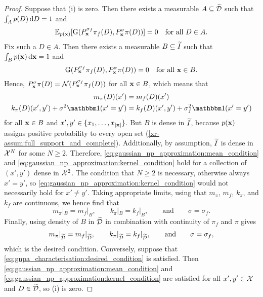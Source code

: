 \documentclass[12pt, twoside]{report}
\newcommand{\xrprefix}[1]{xr-#1}
\begin{document}
\begin{proof}
    Suppose that (i) is zero.
    Then there exists a measurable $A \sub \tD$ such that $\int_A p(D) \isd D = 1$ and
    \begin{equation}
        \E_{p(\vx)}[\text{G}(P^{\sigma_f}_\vx \pi_f(D), P^{\sigma}_\vx \pi(D))] = 0
        \quad \text{for all $D \in A$}.
    \end{equation}
    Fix such a $D \in A$.
    Then there exists a measurable $B \sub \tI$ such that $\int_{B} p(\vx) \isd \vx = 1$ and%
    \begin{equation}
        \text{G}(P^{\sigma_f}_\vx \pi_f(D), P^{\sigma}_\vx \pi(D)) = 0
        \quad \text{for all $\vx \in B$}.
    \end{equation}
    Hence,
    $
        P^{\sigma}_\vx \pi(D)
        = \Normal(P^{\sigma_f}_\vx \pi_f(D))
    $ for all $\vx \in B$, which means that
    \begin{align}
        \label{eq:gaussian_np_approximation:mean_condition}
        m_\pi(D)(x') &= m_f(D)(x') \\
        \label{eq:gaussian_np_approximation:kernel_condition}
        k_\pi(D)(x', y') + \sigma^2 \ind(x' = y') &= k_f(D)(x', y') + \sigma^2_f \ind(x' = y')
    \end{align}
    for all $\vx \in B$ and $x', y' \in \set{x_1, \ldots, x_{\abs{\vx}}}$.
    But $B$ is dense in $\tI$, because $p(\vx)$ assigns positive probability to every open set (\cref{\xrprefix{assum:full_support_and_complete}}). 
    Additionally, by assumption, $\tI$ is dense in $\X^N$ for some $N \ge 2$.
    Therefore, \eqref{eq:gaussian_np_approximation:mean_condition} and \eqref{eq:gaussian_np_approximation:kernel_condition} hold for a collection of $(x',y')$ dense in $\X^2$.
    The condition that $N \ge 2$ is necessary, otherwise always $x' = y'$, so \eqref{eq:gaussian_np_approximation:kernel_condition} would not necessarily hold for $x' \neq y'$.
    Taking appropriate limits, using that $m_\pi$, $m_f$, $k_\pi$, and $k_f$ are continuous, we hence find that
    \begin{equation}
        m_\pi|_{B} = m_f|_{B},
        \qquad
        k_\pi|_{B} = k_f|_{B},
        \qquad
        \text{and}
        \qquad
        \sigma = \sigma_f.
    \end{equation}
    Finally, using density of $B$ in $\tD$ in combination with continuity of $\pi_f$ and $\pi$ gives
    \begin{equation} \label{eq:gnpa_characterisation:desired_condition}
        m_\pi|_{\tD} = m_f|_{\tD},
        \qquad
        k_\pi|_{\tD} = k_f|_{\tD},
        \qquad
        \text{and}
        \qquad
        \sigma = \sigma_f,
    \end{equation}
    which is the desired condition.
    Conversely, suppose that \eqref{eq:gnpa_characterisation:desired_condition} is satisfied.
    Then \eqref{eq:gaussian_np_approximation:mean_condition} and \eqref{eq:gaussian_np_approximation:kernel_condition} are satisfied for all $x', y' \in \X$ and $D \in \tD$, so (i) is zero.
\end{proof}
\end{document}
